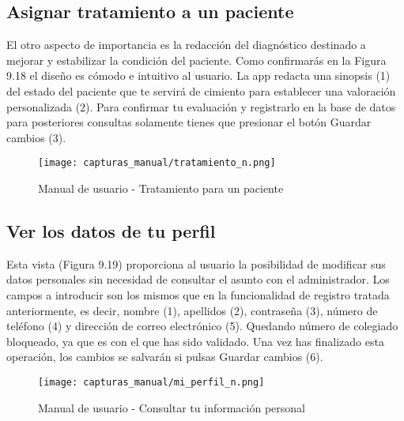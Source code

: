 \documentclass[11pt,spanish,
		listoftables,listoffigures]
		{tfgplantilla}
\begin{document}
\subsection {Asignar tratamiento a un paciente}

El otro aspecto de importancia es la redacción del diagnóstico destinado a mejorar y estabilizar la condición del paciente. Como confirmarás en la Figura 9.18 el diseño es cómodo e intuitivo al usuario. La app redacta una sinopsis (1) del estado del paciente que te servirá de cimiento para establecer una valoración personalizada (2). Para confirmar tu evaluación y registrarlo en la base de datos para posteriores consultas solamente tienes que presionar el botón \textquotedbl Guardar cambios\textquotedbl{} (3).

\begin{figure}[H]
\centering
\texttt{[image: capturas\_manual/tratamiento\_n.png]}
\caption{Manual de usuario - Tratamiento para un paciente}
\end{figure}

\newpage
\subsection {Ver los datos de tu perfil}

Esta vista (Figura 9.19) proporciona al usuario la posibilidad de modificar sus datos personales sin necesidad de consultar el asunto con el administrador. Los campos a introducir son los mismos que en la funcionalidad de registro tratada anteriormente, es decir, nombre (1), apellidos (2), contraseña (3), número de teléfono (4) y dirección de correo electrónico (5). Quedando número de colegiado bloqueado, ya que es con el que has sido validado. Una vez has finalizado esta operación, los cambios se salvarán si pulsas \textquotedbl Guardar cambios\textquotedbl{} (6).

\begin{figure}[H]
\centering
\texttt{[image: capturas\_manual/mi\_perfil\_n.png]}
\caption{Manual de usuario - Consultar tu información personal}
\end{figure}


\newpage
\end{document}
